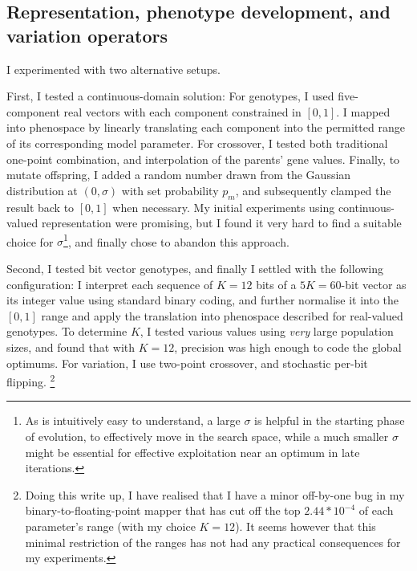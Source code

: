 \documentclass[a4paper,9pt]{article}
\begin{document}
\subsection{Representation, phenotype development, and variation operators}
I experimented with two alternative setups.

First, I tested a continuous-domain solution: For
genotypes, I used five-component real vectors with each component constrained
in $[0, 1]$. I mapped into phenospace by linearly translating each
component into the permitted range of its corresponding model parameter. For
crossover, I tested both traditional one-point combination, and interpolation
of the parents' gene values. Finally, to mutate offspring, I added a random
number drawn from the Gaussian distribution at $(0, \sigma)$ with set
probability $p_m$, and subsequently clamped the result back to $[0, 1]$ when
necessary. 
My initial experiments using continuous-valued representation were
promising, but I found it very hard to find a suitable choice for $\sigma$\footnote{As
is intuitively easy to understand, a large $\sigma$ is helpful in the starting
phase of evolution, to effectively move in the search space, while a much
smaller $\sigma$ might be essential for effective exploitation near an optimum
in late iterations.}, and finally chose to abandon this approach.

Second, I tested bit vector genotypes, and finally I settled with the following
configuration: I interpret each sequence of $K=12$ bits of a $5K=60$-bit vector
as its integer value using standard binary coding, and further normalise it
into the $[0, 1]$ range and apply the translation into phenospace described for
real-valued genotypes.  To determine $K$, I tested various values using
\emph{very} large population sizes, and found that with $K=12$, precision was
high enough to code the global optimums.  For variation, I use two-point
crossover, and stochastic per-bit flipping.  \footnote{Doing this write up, I
have realised that I have a minor off-by-one bug in my binary-to-floating-point
mapper that has cut off the top $2.44 * 10^{-4}$ of each parameter's range
(with my choice $K=12$). It seems however that this minimal restriction of the
ranges has not had any practical consequences for my experiments.}
\end{document}
